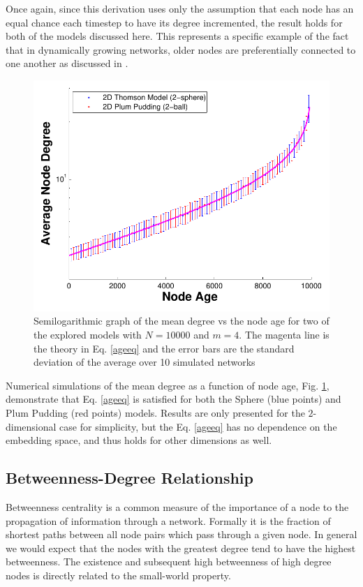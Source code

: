 \documentclass[aps,pre,reprint,superscriptaddress,amsmath,amssymb,nofootinbib]{revtex4-1}
\begin{document}
Once again, since this derivation uses only the assumption that each node has an equal chance each timestep to have its degree incremented, the result holds for both of the models discussed here.
This represents a specific example of the fact that in dynamically growing networks, older nodes are preferentially connected to one another as discussed in \cite{reallyrandom}.
\begin{figure}
\includegraphics[width=\linewidth]{figures/fig12.pdf}
\caption{\label{degage}Semilogarithmic graph of the mean degree vs the node age for two of the explored models with $N = 10000$ and $m = 4$. The magenta line is the theory in Eq. \eqref{ageeq} and the error bars are the standard deviation of the average over 10 simulated networks}
\end{figure}
Numerical simulations of the mean degree as a function of node age, Fig. \ref{degage}, demonstrate that Eq. \eqref{ageeq} is satisfied for both the Sphere (blue points) and Plum Pudding (red points) models.
Results are only presented for the $2$-dimensional case for simplicity, but the Eq. \eqref{ageeq} has no dependence on the embedding space, and thus holds for other dimensions as well.

\subsection{Betweenness-Degree Relationship}	%
Betweenness centrality is a common measure of the importance of a node to the propagation of information through a network.
Formally it is the fraction of shortest paths between all node pairs which pass through a given node.
In general we would expect that the nodes with the greatest degree tend to have the highest betweenness.
The existence and subsequent high betweenness of high degree nodes is directly related to the small-world property.
\end{document}
